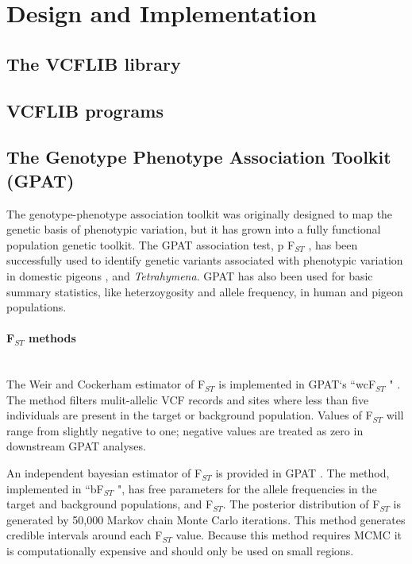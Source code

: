 \documentclass[10pt,letterpaper]{article}
\begin{document}
\section*{Design and Implementation}



\subsection*{The VCFLIB library}

\subsection*{VCFLIB programs}



\subsection*{The Genotype Phenotype Association Toolkit (GPAT)}

The genotype-phenotype association toolkit was originally designed to map the genetic basis of phenotypic variation, but it has grown into a fully functional population genetic toolkit.  The GPAT association test, p F$_{ST}$ , has been successfully used to identify genetic variants associated with phenotypic variation in domestic pigeons
 \cite{color},  and \textit{Tetrahymena}\cite{tet}.  GPAT has also been used for basic summary statistics, like heterzoygosity and allele frequency, in human\cite{iron} and pigeon\cite{pigeon} populations.




\paragraph*{ F$_{ST}$  methods} \mbox{} \\

The Weir and Cockerham estimator of F$_{ST}$ is implemented in GPAT`s ``wcF$_{ST}$ " \cite{fst}.  The method filters mulit-allelic VCF records and sites where less than five individuals are present in the target or background population. Values of F$_{ST}$ will range from slightly negative to one; negative values are treated as zero in downstream GPAT analyses. 

An independent bayesian estimator of F$_{ST}$ is provided in GPAT \cite{bfst}.  The method, implemented in ``bF$_{ST}$ ", has free parameters for the allele frequencies in the target and background populations, and F$_{ST}$.  The posterior distribution of F$_{ST}$ is generated by 50,000 Markov chain Monte Carlo iterations.  This method generates credible intervals around each F$_{ST}$ value.  Because this method requires MCMC it is computationally expensive and should only be used on small regions.
\end{document}
